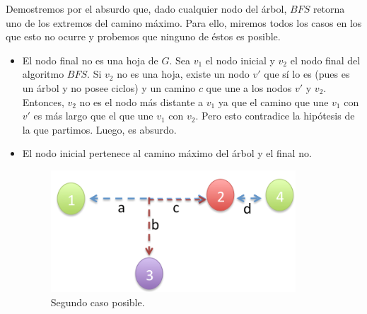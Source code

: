 \begin{itemize}
Demostremos por el absurdo que, dado cualquier nodo del árbol, $BFS$ retorna uno de los extremos del camino máximo. Para ello, miremos todos los casos en los que esto no ocurre y probemos que ninguno de éstos es posible.\newline
\begin {itemize}
\item El nodo final no es una hoja de $G$. \newline
Sea $v_{1}$ el nodo inicial y $v_{2}$ el nodo final del algoritmo $BFS$. Si $v_{2}$ no es una hoja, existe un nodo $v'$ que sí lo es (pues es un árbol y no posee ciclos) y un camino $c$ que une a los nodos $v'$ y $v_{2}$. Entonces, $v_{2}$ no es el nodo más distante a $v_{1}$ ya que el camino que une $v_{1}$ con $v'$ es más largo que el que une $v_{1}$ con $v_{2}$. Pero esto contradice la hipótesis de la que partimos. Luego, es absurdo.\newline  
\item El nodo inicial pertenece al camino máximo del árbol y el final no.

\begin{figure}[H] %
\begin{minipage}[H]{260pt}
\includegraphics[width=260pt]{../imgs/ej2casos02.jpg}
\end{minipage}
\hfill
\caption{Segundo caso posible.}
\end{figure}


\end{itemize}
\end{itemize}
